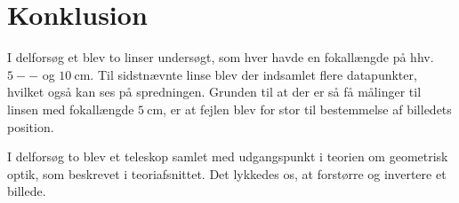 \section{Konklusion}
I delforsøg et blev to linser undersøgt, som hver havde en fokallængde på hhv. $5--$ og $\SI{10}{\centi\meter}$. Til sidstnævnte linse blev der indsamlet flere datapunkter, hvilket også kan ses på spredningen. Grunden til at der er så få målinger til linsen med fokallængde $\SI{5}{\centi\meter}$, er at fejlen blev for stor til bestemmelse af billedets position.

I delforsøg to blev et teleskop samlet med udgangspunkt i teorien om geometrisk optik, som beskrevet i teoriafsnittet. Det lykkedes os, at forstørre og invertere et billede.
